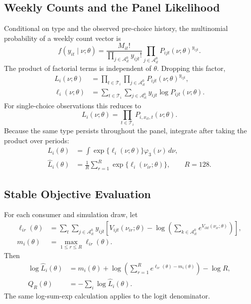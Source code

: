 \documentclass[12pt]{article}
\theoremstyle{definition}
\theoremstyle{remark}
\begin{document}
\subsection{Weekly Counts and the Panel Likelihood}
Conditional on type and the observed pre-choice history, the multinomial
probability of a weekly count vector is
\begin{equation}
 f(y_{it}\mid\nu;\theta)
 =\frac{M_{it}!}{\prod_{j\in\mathcal A_{it}^0}y_{ijt}!}
 \prod_{j\in\mathcal A_{it}^0}P_{ijt}(\nu;\theta)^{y_{ijt}}.
\end{equation}
The product of factorial terms is independent of $\theta$. Dropping this factor,
\begin{align}
 L_i(\nu;\theta)
 &=\prod_{t\in\mathcal T_i}\prod_{j\in\mathcal A_{it}^0}
 P_{ijt}(\nu;\theta)^{y_{ijt}},\\
 \ell_i(\nu;\theta)
 &=\sum_{t\in\mathcal T_i}\sum_{j\in\mathcal A_{it}^0}
 y_{ijt}\log P_{ijt}(\nu;\theta).
\end{align}
For single-choice observations this reduces to
\begin{equation}
 L_i(\nu;\theta)=\prod_{t\in\mathcal T_i}P_{i,x_{it},t}(\nu;\theta).
\end{equation}
Because the same type persists throughout the panel, integrate after taking
the product over periods:
\begin{align}
 L_i(\theta)&=\int\exp\{\ell_i(\nu;\theta)\}\varphi_3(\nu)\,d\nu,\\
 \widehat L_i(\theta)&=\frac{1}{R}\sum_{r=1}^R
 \exp\{\ell_i(\nu_{ir};\theta)\},\qquad R=128.
\end{align}

\subsection{Stable Objective Evaluation}
For each consumer and simulation draw, let
\begin{align}
 \ell_{ir}(\theta)
 &=\sum_t\sum_{j\in\mathcal A_{it}^0}y_{ijt}
 \left[V_{ijt}(\nu_{ir};\theta)
 -\log\!\left(\sum_{k\in\mathcal A_{it}^0}e^{V_{ikt}(\nu_{ir};\theta)}\right)\right],\\
 m_i(\theta)&=\max_{1\le r\le R}\ell_{ir}(\theta).
\end{align}
Then
\begin{align}
 \log\widehat L_i(\theta)
 &=m_i(\theta)+\log\left(\sum_{r=1}^R
 e^{\ell_{ir}(\theta)-m_i(\theta)}\right)-\log R,\\
 Q_R(\theta)&=-\sum_i\log\widehat L_i(\theta).
\end{align}
The same log-sum-exp calculation applies to the logit denominator.
\end{document}
